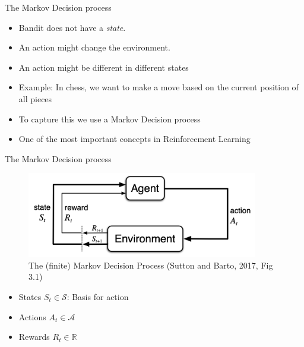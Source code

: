 \documentclass[10pt]{beamer}
\begin{document}
\begin{frame}{The Markov Decision process}

\begin{itemize}
\item Bandit does not have a \emph{state}.\pause
\item An action might {\color{uured}change} the environment.
\item An action might be different in different {\color{uured}states}\pause
\item {\color{uured}Example}: In chess, we want to make a move based on the current position of all pieces\pause
\item To capture this we use a {\color{uured}Markov Decision process}
\item One of the most important concepts in Reinforcement Learning
\end{itemize}

\end{frame}





\begin{frame}{The Markov Decision process}

\begin{figure}[h]
\centering
\includegraphics[width=0.9\textwidth]{fig/sutton_fig_3_1.png}
\caption{The (finite) Markov Decision Process (Sutton and Barto, 2017, Fig 3.1)}
\end{figure}

\begin{itemize}
\item States $S_t \in \mathcal{S}$: Basis for action
\item Actions $A_t \in \mathcal{A}$
\item Rewards $R_t \in \mathbb{R}$
\end{itemize}

\end{frame}
\end{document}
